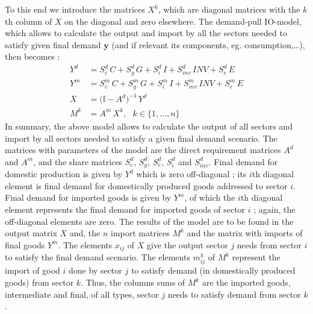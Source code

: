 \documentclass[12pt,english]{article}
\begin{document}
To this end we introduce the matrices $X^k$, which are diagonal matrices with the $k$th column of $X$ on the diagonal and zero elsewhere. The demand-pull IO-model, which allows to calculate the output and import by all the sectors needed to satisfy given final demand $\boldsymbol{y}$ (and if relevant its components, eg. consumption,\ldots), then becomes :
\begin{align}
Y^d &= S^d_{c} \, C + S^d_{g} \, G + S^d_{i} \, I + S^d_{inv} \, INV + S^d_{e} \, E \\
Y^m &= S^m_{c} \,C + S^m_{g}\, G + S^m_{i}\, I + S^m_{inv}\, INV + S^m_{e}\, E \\
X &= \big(\mathbb{I} - A^d \big)^{-1} \, Y^d  \\
M^k &= A^m \, X^k, \ \ \  k \in \{1,\ldots,n\} \label{Mk}
\end{align}
In summary, the above model allows to calculate the output of all sectors and import by all sectors needed to satisfy a given final demand scenario. The matrices with parameters of the model are the direct requirement matrices $A^d$ and $A^m$, and the share matrices $S^d_{c}$, $S^d_{g}$, $S^d_{e}$, $S^d_{i}$ and $S^d_{inv}$. Final demand for domestic production is given by $Y^d$ which is zero off-diagonal ; its $i$th diagonal element is final demand for domestically produced goods addressed to sector $i$. Final demand for imported goods is given by $Y^m$, of which the $i$th diagonal element represents the final demand for imported goods of sector $i$ ; again, the off-diagonal elements are zero. The results of the model are to be found in the output matrix $X$ and, the $n$ import matrices $M^k$ and the matrix with imports of final goods $Y^m$. The elements $x_{ij}$ of $X$ give the output sector $j$ needs from sector $i$ to satisfy the final demand scenario. The elements $m^k_{ij}$ of $M^k$ represent the import of good $i$ done by sector $j$ to satisfy demand (in domestically produced goods) from sector $k$. Thus, the columns sums of $M^k$ are the imported goods, intermediate and final, of all types, sector $j$ needs to satisfy demand from sector $k$.


\end{document}
